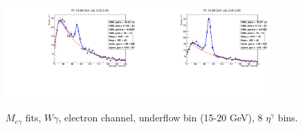 \begin{figure}[htb]
\begin{center}
   \includegraphics[width=0.45\textwidth]{../figs/figs_v11/ELECTRON_WGamma/EtoGammaFits/sa_hZmass_h_Data_EtoGamma_Enr_ENDCAP_pt15to20_ieta2_noWMtCut.pdf}\includegraphics[width=0.45\textwidth]{../figs/figs_v11/ELECTRON_WGamma/EtoGammaFits/sa_hZmass_h_Data_EtoGamma_Enr_ENDCAP_pt15to20_ieta3_noWMtCut.pdf}\\
  \label{fig:etogFits_15to20}
  \caption{$M_{e\gamma}$ fits, $W\gamma$, electron channel, underflow bin (15-20 GeV), 8 $\eta^{\gamma}$ bins.}
  \end{center}
\end{figure}

